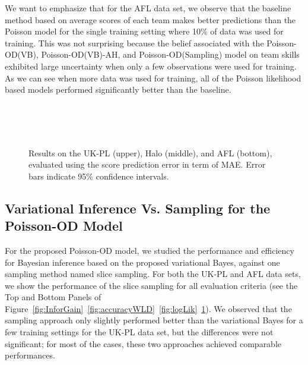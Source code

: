We want to emphasize that for the AFL data set, we observe that the baseline method based on average scores of each team makes better predictions than the Poisson model for the single training setting where 10\% of data was used for training. This was not surprising because the belief associated with the Poisson-OD(VB), Poisson-OD(VB)-AH, and Poisson-OD(Sampling) model on team skills exhibited large uncertainty when only a few observations were used for training. As we can see when more data was used for training, all of the Poisson likelihood based models performed significantly better than the baseline. 

\begin{center}
\begin{figure}[htbp!]
 \centering
 \\
\\
\\
\caption{\small Results on the UK-PL (upper), Halo (middle), and AFL (bottom), evaluated
using the score prediction error in term of MAE. Error bars indicate
95\% confidence intervals.}
\label{fig:ScoreError}
\end{figure}
\end{center}

\subsection{Variational Inference Vs. Sampling for the Poisson-OD Model}
\label{sec:VBSampling}
For the proposed Poisson-OD model, we studied the performance and efficiency for Bayesian inference based on the proposed variational Bayes, against one sampling method named slice sampling. For both the UK-PL and AFL data sets, we show the performance of the slice sampling for all evaluation criteria (see the Top and Bottom Panels of Figure~\ref{fig:InforGain}~\ref{fig:accuracyWLD}~\ref{fig:logLik}~\ref{fig:ScoreError}). We observed that the sampling approach only slightly performed better than the variational Bayes for a few training settings for the UK-PL data set, but the differences were not significant; for  most of the cases, these two approaches achieved comparable performances. 


